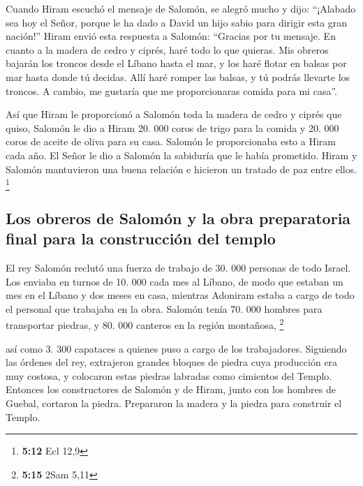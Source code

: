  Cuando Hiram escuchó el mensaje de Salomón, se alegró
mucho y dijo: ``¡Alabado sea hoy el Señor, porque le ha dado a David un
hijo sabio para dirigir esta gran nación!''  Hiram envió
esta respuesta a Salomón: ``Gracias por tu mensaje. En cuanto a la
madera de cedro y ciprés, haré todo lo que quieras.  Mis
obreros bajarán los troncos desde el Líbano hasta el mar, y los haré
flotar en balsas por mar hasta donde tú decidas. Allí haré romper las
balsas, y tú podrás llevarte los troncos. A cambio, me gustaría que me
proporcionaras comida para mi casa''.

 Así que Hiram le proporcionó a Salomón toda la madera de
cedro y ciprés que quiso,  Salomón le dio a Hiram 20. 000
coros de trigo para la comida y 20. 000 coros de aceite de oliva para su
casa. Salomón le proporcionaba esto a Hiram cada año.  El
Señor le dio a Salomón la sabiduría que le había prometido. Hiram y
Salomón mantuvieron una buena relación e hicieron un tratado de paz
entre ellos. \footnote{\textbf{5:12} Ecl 12,9}

\hypertarget{los-obreros-de-salomuxf3n-y-la-obra-preparatoria-final-para-la-construcciuxf3n-del-templo}{%
\subsection{Los obreros de Salomón y la obra preparatoria final para la
construcción del
templo}\label{los-obreros-de-salomuxf3n-y-la-obra-preparatoria-final-para-la-construcciuxf3n-del-templo}}

 El rey Salomón reclutó una fuerza de trabajo de 30. 000
personas de todo Israel.  Los enviaba en turnos de 10.
000 cada mes al Líbano, de modo que estaban un mes en el Líbano y dos
meses en casa, mientras Adoniram estaba a cargo de todo el personal que
trabajaba en la obra.  Salomón tenía 70. 000 hombres para
transportar piedras, y 80. 000 canteros en la región montañosa,
\footnote{\textbf{5:15} 2Sam 5,11}

 así como 3. 300 capataces a quienes puso a cargo de los
trabajadores.  Siguiendo las órdenes del rey, extrajeron
grandes bloques de piedra cuya producción era muy costosa, y colocaron
estas piedras labradas como cimientos del Templo. 
Entonces los constructores de Salomón y de Hiram, junto con los hombres
de Guebal, cortaron la piedra. Prepararon la madera y la piedra para
construir el Templo.

